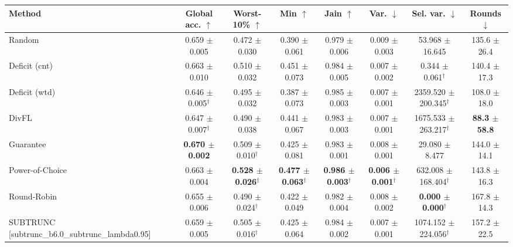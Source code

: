 \begin{tabular}{lccccccc}
\toprule
Method & Global acc. $\uparrow$ & Worst-10\% $\uparrow$ & Min $\uparrow$ & Jain $\uparrow$ & Var. $\downarrow$ & Sel. var. $\downarrow$ & Rounds $\downarrow$ \\
\midrule
Random & 0.659 $\pm$ 0.005 & 0.472 $\pm$ 0.030 & 0.390 $\pm$ 0.061 & 0.979 $\pm$ 0.006 & 0.009 $\pm$ 0.003 & 53.968 $\pm$ 16.645 & 135.6 $\pm$ 26.4 \\
Deficit (cnt) & 0.663 $\pm$ 0.010 & 0.510 $\pm$ 0.032 & 0.451 $\pm$ 0.073 & 0.984 $\pm$ 0.005 & 0.007 $\pm$ 0.002 & 0.344 $\pm$ 0.061$^\dagger$ & 140.4 $\pm$ 17.3 \\
Deficit (wtd) & 0.646 $\pm$ 0.005$^\dagger$ & 0.495 $\pm$ 0.032 & 0.387 $\pm$ 0.073 & 0.985 $\pm$ 0.003 & 0.007 $\pm$ 0.001 & 2359.520 $\pm$ 200.345$^\dagger$ & 108.0 $\pm$ 18.0 \\
DivFL & 0.647 $\pm$ 0.007$^\dagger$ & 0.490 $\pm$ 0.038 & 0.441 $\pm$ 0.067 & 0.983 $\pm$ 0.003 & 0.007 $\pm$ 0.001 & 1675.533 $\pm$ 263.217$^\dagger$ & \textbf{88.3 $\pm$ 58.8} \\
Guarantee & \textbf{0.670 $\pm$ 0.002} & 0.509 $\pm$ 0.010$^\dagger$ & 0.425 $\pm$ 0.081 & 0.983 $\pm$ 0.001 & 0.008 $\pm$ 0.001 & 29.080 $\pm$ 8.477 & 144.0 $\pm$ 14.1 \\
Power-of-Choice & 0.663 $\pm$ 0.004 & \textbf{0.528 $\pm$ 0.026}$^\dagger$ & \textbf{0.477 $\pm$ 0.063}$^\dagger$ & \textbf{0.986 $\pm$ 0.003}$^\dagger$ & \textbf{0.006 $\pm$ 0.001}$^\dagger$ & 632.008 $\pm$ 168.404$^\dagger$ & 143.8 $\pm$ 16.3 \\
Round-Robin & 0.655 $\pm$ 0.006 & 0.490 $\pm$ 0.024$^\dagger$ & 0.422 $\pm$ 0.049 & 0.982 $\pm$ 0.004 & 0.008 $\pm$ 0.002 & \textbf{0.000 $\pm$ 0.000}$^\dagger$ & 167.8 $\pm$ 14.3 \\
SUBTRUNC [subtrunc\_b6.0\_subtrunc\_lambda0.95] & 0.659 $\pm$ 0.005 & 0.505 $\pm$ 0.016$^\dagger$ & 0.425 $\pm$ 0.064 & 0.984 $\pm$ 0.002 & 0.007 $\pm$ 0.001 & 1074.152 $\pm$ 224.056$^\dagger$ & 157.2 $\pm$ 22.5 \\
\bottomrule
\end{tabular}
